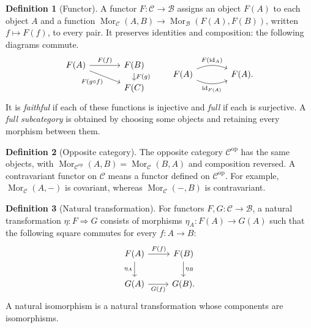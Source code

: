 \documentclass[11pt]{article}
\theoremstyle{definition}
\newtheorem{definition}{Definition}[section]
\theoremstyle{plain}
\newcommand{\C}{\mathcal C}
\newcommand{\B}{\mathcal B}
\newcommand{\Mor}{\operatorname{Mor}}
\newcommand{\id}{\operatorname{id}}
\begin{document}
\begin{definition}[Functor]
A functor $F\colon\C\to\B$ assigns an object $F(A)$ to each object $A$ and a function
$\Mor_{\C}(A,B)\to\Mor_{\B}(F(A),F(B))$, written $f\mapsto F(f)$, to every pair. It preserves identities and composition: the following diagrams commute.
\[
\begin{tikzcd}[column sep=large,row sep=small]
F(A)\arrow[r,"F(f)"]\arrow[dr,"F(g\circ f)"']&F(B)\arrow[d,"F(g)"]\\
&F(C)
\end{tikzcd}
\qquad
\begin{tikzcd}[column sep=large]
F(A)\arrow[r,bend left=22,"F(\id_A)"]\arrow[r,bend right=22,"\id_{F(A)}"']&F(A).
\end{tikzcd}
\]
It is \emph{faithful} if each of these functions is injective and \emph{full} if each is surjective. A \emph{full subcategory} is obtained by choosing some objects and retaining every morphism between them.
\end{definition}

\begin{definition}[Opposite category]
The opposite category $\C^{\mathrm{op}}$ has the same objects, with
$\Mor_{\C^{\mathrm{op}}}(A,B)=\Mor_{\C}(B,A)$ and composition reversed. A contravariant functor on $\C$ means a functor defined on $\C^{\mathrm{op}}$. For example, $\Mor_{\C}(A,-)$ is covariant, whereas $\Mor_{\C}(-,B)$ is contravariant.
\end{definition}

\begin{definition}[Natural transformation]
For functors $F,G\colon\C\to\B$, a natural transformation $\eta\colon F\Rightarrow G$ consists of morphisms $\eta_A\colon F(A)\to G(A)$ such that the following square commutes for every $f\colon A\to B$:
\[
\begin{tikzcd}
F(A)\arrow[r,"F(f)"]\arrow[d,"\eta_A"']&F(B)\arrow[d,"\eta_B"]\\
G(A)\arrow[r,"G(f)"']&G(B).
\end{tikzcd}
\]
A natural isomorphism is a natural transformation whose components are isomorphisms.
\end{definition}
\end{document}
